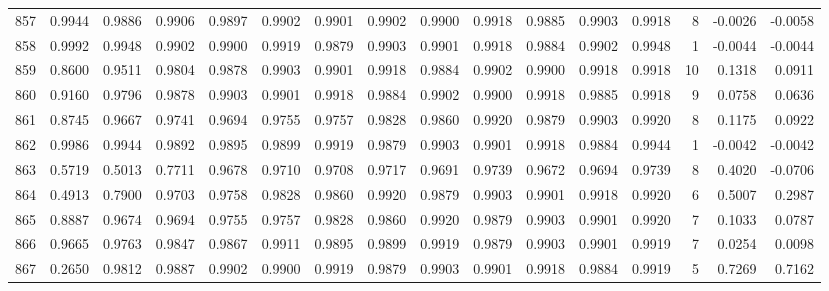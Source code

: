 \begin{tabular}{lrrrrrrrrrrrrrrr}
857 &      0.9944 &  0.9886 &  0.9906 &  0.9897 &  0.9902 &  0.9901 &  0.9902 &  0.9900 &  0.9918 &  0.9885 &   0.9903 &     0.9918 &      8 &                   -0.0026 &                    -0.0058 \\
858 &      0.9992 &  0.9948 &  0.9902 &  0.9900 &  0.9919 &  0.9879 &  0.9903 &  0.9901 &  0.9918 &  0.9884 &   0.9902 &     0.9948 &      1 &                   -0.0044 &                    -0.0044 \\
859 &      0.8600 &  0.9511 &  0.9804 &  0.9878 &  0.9903 &  0.9901 &  0.9918 &  0.9884 &  0.9902 &  0.9900 &   0.9918 &     0.9918 &     10 &                    0.1318 &                     0.0911 \\
860 &      0.9160 &  0.9796 &  0.9878 &  0.9903 &  0.9901 &  0.9918 &  0.9884 &  0.9902 &  0.9900 &  0.9918 &   0.9885 &     0.9918 &      9 &                    0.0758 &                     0.0636 \\
861 &      0.8745 &  0.9667 &  0.9741 &  0.9694 &  0.9755 &  0.9757 &  0.9828 &  0.9860 &  0.9920 &  0.9879 &   0.9903 &     0.9920 &      8 &                    0.1175 &                     0.0922 \\
862 &      0.9986 &  0.9944 &  0.9892 &  0.9895 &  0.9899 &  0.9919 &  0.9879 &  0.9903 &  0.9901 &  0.9918 &   0.9884 &     0.9944 &      1 &                   -0.0042 &                    -0.0042 \\
863 &      0.5719 &  0.5013 &  0.7711 &  0.9678 &  0.9710 &  0.9708 &  0.9717 &  0.9691 &  0.9739 &  0.9672 &   0.9694 &     0.9739 &      8 &                    0.4020 &                    -0.0706 \\
864 &      0.4913 &  0.7900 &  0.9703 &  0.9758 &  0.9828 &  0.9860 &  0.9920 &  0.9879 &  0.9903 &  0.9901 &   0.9918 &     0.9920 &      6 &                    0.5007 &                     0.2987 \\
865 &      0.8887 &  0.9674 &  0.9694 &  0.9755 &  0.9757 &  0.9828 &  0.9860 &  0.9920 &  0.9879 &  0.9903 &   0.9901 &     0.9920 &      7 &                    0.1033 &                     0.0787 \\
866 &      0.9665 &  0.9763 &  0.9847 &  0.9867 &  0.9911 &  0.9895 &  0.9899 &  0.9919 &  0.9879 &  0.9903 &   0.9901 &     0.9919 &      7 &                    0.0254 &                     0.0098 \\
867 &      0.2650 &  0.9812 &  0.9887 &  0.9902 &  0.9900 &  0.9919 &  0.9879 &  0.9903 &  0.9901 &  0.9918 &   0.9884 &     0.9919 &      5 &                    0.7269 &                     0.7162 \\

\end{tabular}
